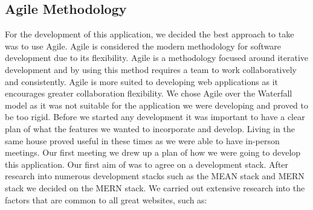 \subsection{Agile Methodology}
For the development of this application, we decided the best approach to take was to use Agile. Agile is considered the modern methodology for software development due to its flexibility. Agile is a methodology focused around iterative development and by using this method requires a team to work collaboratively and consistently. Agile is more suited to developing web applications as it encourages greater collaboration flexibility. We chose Agile over the Waterfall model as it was not suitable for the application we were developing and proved to be too rigid. Before we started any development it was important to have a clear plan of what the features we wanted to incorporate and develop. Living in the same house proved useful in these times as we were able to have in-person meetings. Our first meeting we drew up a plan of how we were going to develop this application. Our first aim of was to agree on a development stack. After research into numerous development stacks such as the MEAN stack and MERN stack we decided on the MERN stack. We carried out extensive research into the factors that are common to all great websites, such as:

